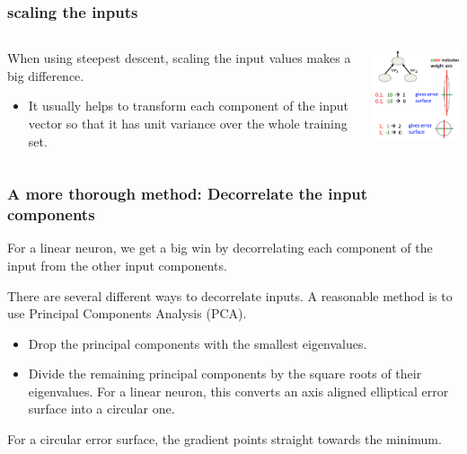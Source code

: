 \documentclass[USenglish,pdftex,compress,10pt,svgnamesi,handout]{beamer}
\begin{document}
\begin{frame}
\frametitle{scaling the inputs}
\begin{columns}
\begin{column}{6cm}
When using steepest descent, scaling the input values makes a big difference.
\begin{itemize}
\item It usually helps to transform each component of the input vector so that it has unit variance over the whole training set.
\end{itemize}
\end{column}
\begin{column}{5cm}
\includegraphics[width=5cm]{pics/2-inputscale.png}
\end{column}
\end{columns}
\end{frame}




\begin{frame}
\frametitle{A more thorough method: Decorrelate the input components}
For a linear neuron, we get a big win by decorrelating each component of the input from the other input components.

There are several different ways to decorrelate inputs. A reasonable method is to use Principal Components Analysis (PCA).
\begin{itemize}
\item  Drop the principal components with the smallest eigenvalues.
\item  Divide the remaining principal components by the square roots of their eigenvalues. For a linear neuron, this converts an axis aligned elliptical error surface into a circular one.
\end{itemize}
For a circular error surface, the gradient points straight towards the minimum.

\end{frame}
\end{document}
